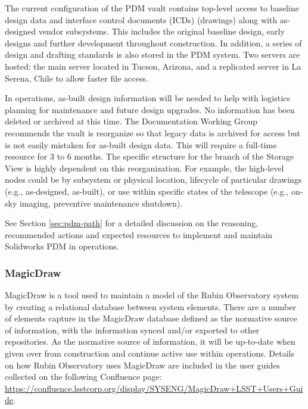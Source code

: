 The current configuration of the PDM vault contains top-level access to baseline design data and interface control documents (ICDs) (drawings) along with as-designed vendor subsystems.
This includes the original baseline design, early designs and further development throughout construction.
In addition, a series of design and drafting standards is also stored in the PDM system.
Two servers are hosted: the main server located in Tucson, Arizona, and a replicated server in La Serena, Chile to allow faster file access.

In operations, as-built design information will be needed to help with logistics planning for maintenance and future design upgrades.
No information has been deleted or archived at this time.
The Documentation Working Group recommends the vault is reorganize so that legacy data is archived for access but is not easily mistaken for as-built design data.
This will require a full-time resource for 3 to 6 months.
The specific structure for the branch of the Storage View is highly dependent on this reorganization.
For example, the high-level nodes could be by subsystem or physical location, lifecycle of particular drawings (e.g., as-designed, as-built), or use within specific states of the telescope (e.g., on-sky imaging, preventive maintenance shutdown).

See Section \ref{sec:pdm-path} for a detailed discussion on the reasoning, recommended actions and expected resources to implement and maintain Solidworks PDM in operations.

\subsubsection{MagicDraw}

MagicDraw \citep{MagicDraw-cite} is a tool used to maintain a model of the Rubin Observatory system by creating a relational database between system elements.
There are a number of elements capture in the MagicDraw database defined as the normative source of information, with the information synced and/or exported to other repositories.
As the normative source of information, it will be up-to-date when given over from construction and continue active use within operations.
Details on how Rubin Observatory uses MagicDraw are included in the user guides collected on the following Confluence page: \url{https://confluence.lsstcorp.org/display/SYSENG/MagicDraw+LSST+Users+Guide}.

